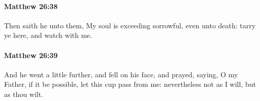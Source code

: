 		\paragraph{Matthew 26:38} %
			\label{MATTHEW-26-38}

			Then saith he unto them, My soul is exceeding sorrowful, even unto death: tarry ye here, and watch with me.

			\begin{framed}
			\scriptsize
				\begin{compactdesc}
					\item[SBLG] 
				\end{compactdesc}
			\end{framed}

		\paragraph{Matthew 26:39} %
			\label{MATTHEW-26-39}

			And he went a little further, and fell on his face, and prayed, saying, O my Father, if it be possible, let this cup pass from me: nevertheless not as I will, but as thou wilt.

